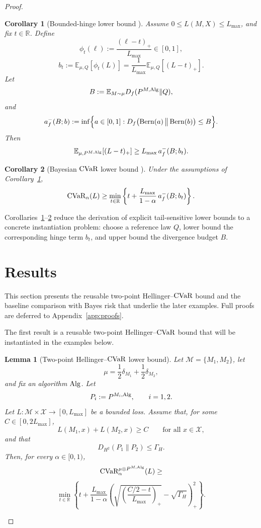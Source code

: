 \documentclass[conference]{IEEEtran}
\newtheorem{corollary}{Corollary}
\newtheorem{lemma}{Lemma}
\begin{document}
\begin{proof}[Proof]
\begin{corollary}[Bounded-hinge lower bound {\cite[Cor.~2]{bongole2026generalizing}}]
\label{cor:hinge-lower}
Assume \(0\le L(M,X)\le L_{\max}\), and fix \(t\in\mathbb R\). Define
\[
\phi_t(\ell):=\frac{(\ell-t)_+}{L_{\max}}\in[0,1],
\]
\[
b_t
:=
\mathbb{E}_{\mu,Q}[\phi_t(L)]
=
\frac{1}{L_{\max}}\mathbb{E}_{\mu,Q}[(L-t)_+].
\]
Let
\[
B:=\mathbb{E}_{M\sim\mu}D_f(P^{M,\textup{Alg}}\|Q),
\]
and
\[
a_f^{-}(B;b)
:=
\inf\Bigl\{a\in[0,1]:
D_f\big(\textup{Bern}(a)\,\big\|\,\textup{Bern}(b)\big)\le B
\Bigr\}.
\]
Then
\[
\mathbb{E}_{\mu,P^{M,\textup{Alg}}}[(L-t)_+]
\ge
L_{\max}\,a_f^{-}(B;b_t).
\]
\end{corollary}

\begin{corollary}[Bayesian \(\textup{CVaR}\) lower bound {\cite[Cor.~3]{bongole2026generalizing}}]
\label{cor:cvar-lower-bt}
Under the assumptions of Corollary~\ref{cor:hinge-lower},
\[
\textup{CVaR}_\alpha(L)
\ge
\min_{t\in\mathbb R}
\left\{
t+\frac{L_{\max}}{1-\alpha}\,a_f^{-}(B;b_t)
\right\}.
\]
\end{corollary}

Corollaries~\ref{cor:hinge-lower}--\ref{cor:cvar-lower-bt} reduce the derivation of explicit tail-sensitive lower bounds to a concrete instantiation problem: choose a reference law \(Q\), lower bound the corresponding hinge term \(b_t\), and upper bound the divergence budget \(B\). 

\section{Results}
\label{sec:results}
This section presents the reusable two-point Hellinger--\(\textup{CVaR}\) bound and the baseline comparison with Bayes risk that underlie the later examples. Full proofs are deferred to Appendix~\ref{app:proofs}. 

The first result is a reusable two-point Hellinger--\(\textup{CVaR}\) bound that will be instantiated in the examples below. 

\begin{lemma}[Two-point Hellinger--\(\textup{CVaR}\) lower bound]
\label{lem:two-point-hellinger-cvar}
Let \(\mathcal M=\{M_1,M_2\}\), let
\[
\mu=\frac12\delta_{M_1}+\frac12\delta_{M_2},
\]
and fix an algorithm \(\textup{Alg}\). Let
\[
P_i:=P^{M_i,\textup{Alg}},\qquad i=1,2.
\]
Let \(L:\mathcal M\times\mathcal X\to[0,L_{\max}]\) be a bounded loss. Assume that, for some \(C\in[0,2L_{\max}]\),
\[
L(M_1,x)+L(M_2,x)\ge C
\qquad
\text{for all }x\in\mathcal X,
\tag{H1}
\]
and that
\[
D_{H^2}(P_1\|P_2)\le \Gamma_H.
\tag{H2}
\]
Then, for every \(\alpha\in[0,1)\),
\[
\textup{CVaR}_\alpha^{\mu\otimes P^{M,\textup{Alg}}}(L)
\ge\]
\[
\min_{t\in\mathbb R}
\left\{
t+\frac{L_{\max}}{1-\alpha}
\left(
\sqrt{\left(\frac{C/2-t}{L_{\max}}\right)_+}
-\sqrt{\Gamma_H}
\right)_+^2
\right\}.
\]
\end{lemma}


\end{proof}
\end{document}
